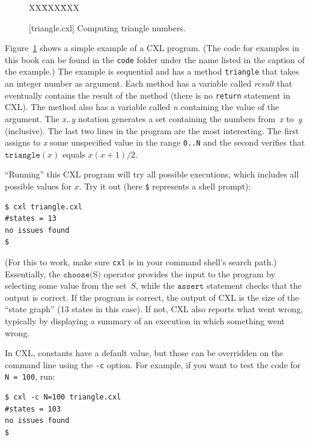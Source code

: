 \documentclass{report}
\newcommand{\cxlsource}[1]{
\begin{tabbing}
XX\=XXX\=XXX\kill
    
\end{tabbing}
}
\newenvironment{code}{
\tcolorbox
}{
\endtcolorbox
}
\begin{document}
\begin{figure}
\begin{code}
\cxlsource{triangle}
\end{code}
\caption{[triangle.cxl] Computing triangle numbers.}
\label{fig:triangle}
\end{figure}

Figure~\ref{fig:triangle} shows a simple example of a CXL program.
(The code for examples in this book can be found in the \texttt{code} folder under
the name listed in the caption of the example.)
The example is sequential and has a method \texttt{triangle} that takes
an integer number as argument.  Each method has a variable called
\textit{result} that eventually contains the result of the
method (there is no \texttt{return} statement in CXL).  The method
also has a variable called \textit{n} containing the value of the
argument.  The \textit{x..y} notation generates a set containing the numbers
from~\textit{x} to~\textit{y} (inclusive).  The last two lines in the program are
the most interesting.
The first assigns to \textit{x} some unspecified value in the range \texttt{0..N}
and the second verifies that $\mathtt{triangle}(x)$ equals $x(x+1)/2$.

``Running'' this CXL program will try all possible executions, which
includes all possible values for $x$.  Try it out (here \texttt{\$}
represents a shell prompt):

\begin{code}
\begin{verbatim}
$ cxl triangle.cxl
#states = 13
no issues found
$
\end{verbatim}
\end{code}

(For this to work, make sure \texttt{cxl} is in your command shell's search path.)
Essentially, the $\texttt{choose}($S$)$
operator provides the input to the program by selecting some value from the
set~$S$, while the $\texttt{assert}$ statement checks that the output is
correct.  If the program is correct, the output of CXL is the size of the
``state graph'' (13 states in this case).  If not, CXL also
reports what went wrong, typically by displaying a summary of an execution in
which something went wrong.

In CXL, constants have a default value,
but those can be overridden on the command
line using the \texttt{-c} option.
For example, if you want to test the code for \texttt{N = 100}, run:
\begin{code}
\begin{verbatim}
$ cxl -c N=100 triangle.cxl
#states = 103
no issues found
$
\end{verbatim}
\end{code}
\end{document}
